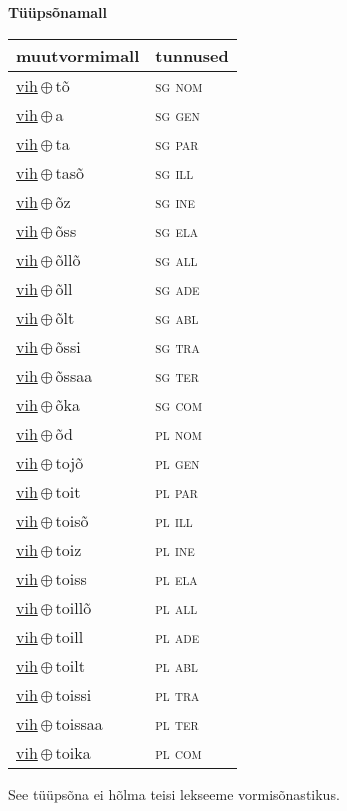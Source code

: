 

\vspace{3.5em}
\noindent \begin{minipage}{\textwidth}
\noindent \textbf{Tüüpsõnamall \,}\\

\begin{sideways}
\begin{tabular}{l l}
muutvormimall & tunnused \\
\hline
\underline{vih}\,$\oplus$\,tõ & \textsc{ sg nom } \\
\underline{vih}\,$\oplus$\,a & \textsc{ sg gen } \\
\underline{vih}\,$\oplus$\,ta & \textsc{ sg par } \\
\underline{vih}\,$\oplus$\,tasõ & \textsc{ sg ill } \\
\underline{vih}\,$\oplus$\,õz & \textsc{ sg ine } \\
\underline{vih}\,$\oplus$\,õss & \textsc{ sg ela } \\
\underline{vih}\,$\oplus$\,õllõ & \textsc{ sg all } \\
\underline{vih}\,$\oplus$\,õll & \textsc{ sg ade } \\
\underline{vih}\,$\oplus$\,õlt & \textsc{ sg abl } \\
\underline{vih}\,$\oplus$\,õssi & \textsc{ sg tra } \\
\underline{vih}\,$\oplus$\,õssaa & \textsc{ sg ter } \\
\underline{vih}\,$\oplus$\,õka & \textsc{ sg com } \\
\underline{vih}\,$\oplus$\,õd & \textsc{ pl nom } \\
\underline{vih}\,$\oplus$\,tojõ & \textsc{ pl gen } \\
\underline{vih}\,$\oplus$\,toit & \textsc{ pl par } \\
\underline{vih}\,$\oplus$\,toisõ & \textsc{ pl ill } \\
\underline{vih}\,$\oplus$\,toiz & \textsc{ pl ine } \\
\underline{vih}\,$\oplus$\,toiss & \textsc{ pl ela } \\
\underline{vih}\,$\oplus$\,toillõ & \textsc{ pl all } \\
\underline{vih}\,$\oplus$\,toill & \textsc{ pl ade } \\
\underline{vih}\,$\oplus$\,toilt & \textsc{ pl abl } \\
\underline{vih}\,$\oplus$\,toissi & \textsc{ pl tra } \\
\underline{vih}\,$\oplus$\,toissaa & \textsc{ pl ter } \\
\underline{vih}\,$\oplus$\,toika & \textsc{ pl com } \\
\end{tabular}
\end{sideways}
\label{tab:tüüpsõnamall-vihtõ}

\end{minipage}

 
\vspace{1em}
\noindent See tüüpsõna ei hõlma teisi lekseeme vormi\-sõnastikus.
